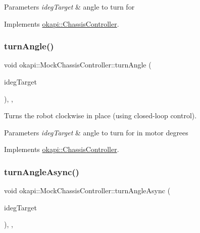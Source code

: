 \begin{DoxyParams}{Parameters}
{\em ideg\+Target} & angle to turn for \\
\hline
\end{DoxyParams}


Implements \mbox{\hyperlink{classokapi_1_1ChassisController_aab12308b3fad6793c007d7a33730a3f7}{okapi\+::\+Chassis\+Controller}}.

\mbox{\label{classokapi_1_1MockChassisController_a4997a97da26d966dcec4f377cfc29434}} 
\subsubsection{\texorpdfstring{turnAngle()}{turnAngle()}\hspace{0.1cm}{\footnotesize\ttfamily [2/2]}}
{\footnotesize\ttfamily void okapi\+::\+Mock\+Chassis\+Controller\+::turn\+Angle (\begin{DoxyParamCaption}\item[{double}]{ideg\+Target }\end{DoxyParamCaption})\hspace{0.3cm}{\ttfamily [inline]}, {\ttfamily [override]}, {\ttfamily [virtual]}}



Turns the robot clockwise in place (using closed-\/loop control). 


\begin{DoxyParams}{Parameters}
{\em ideg\+Target} & angle to turn for in motor degrees \\
\hline
\end{DoxyParams}


Implements \mbox{\hyperlink{classokapi_1_1ChassisController_a6aca227e35ececd02eed1cc42d09ad1d}{okapi\+::\+Chassis\+Controller}}.

\mbox{\label{classokapi_1_1MockChassisController_a1811d7daa6219c274bf57a2c58d96204}} 
\subsubsection{\texorpdfstring{turnAngleAsync()}{turnAngleAsync()}\hspace{0.1cm}{\footnotesize\ttfamily [1/2]}}
{\footnotesize\ttfamily void okapi\+::\+Mock\+Chassis\+Controller\+::turn\+Angle\+Async (\begin{DoxyParamCaption}\item[{Q\+Angle}]{ideg\+Target }\end{DoxyParamCaption})\hspace{0.3cm}{\ttfamily [inline]}, {\ttfamily [override]}, {\ttfamily [virtual]}}



